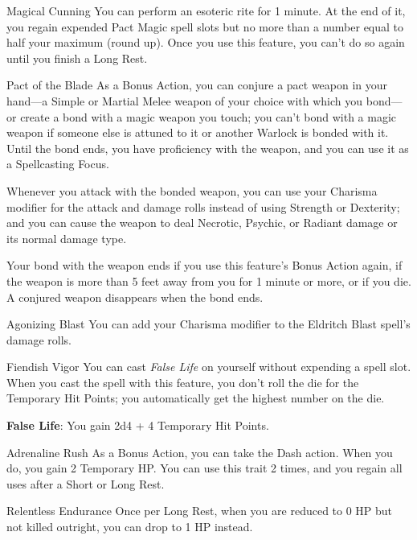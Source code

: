\begin{Card}{Magical Cunning}
You can perform an esoteric rite for 1 minute. At the end of it, you regain expended Pact Magic spell slots but no more than a number equal to half your maximum (round up). Once you use this feature, you can't do so again until you finish a Long Rest.
\end{Card}


\begin{Card}{Pact of the Blade}
As a Bonus Action, you can conjure a pact weapon in your hand—a Simple or Martial Melee weapon of your choice with which you bond—or create a bond with a magic weapon you touch; you can't bond with a magic weapon if someone else is attuned to it or another Warlock is bonded with it. Until the bond ends, you have proficiency with the weapon, and you can use it as a Spellcasting Focus.

Whenever you attack with the bonded weapon, you can use your Charisma modifier for the attack and damage rolls instead of using Strength or Dexterity; and you can cause the weapon to deal Necrotic, Psychic, or Radiant damage or its normal damage type.

Your bond with the weapon ends if you use this feature's Bonus Action again, if the weapon is more than 5 feet away from you for 1 minute or more, or if you die. A conjured weapon disappears when the bond ends.
\end{Card}


\begin{Card}{Agonizing Blast}
You can add your Charisma modifier to the Eldritch Blast spell's damage rolls.
\end{Card}


\begin{Card}{Fiendish Vigor}
You can cast \textit{False Life} on yourself without expending a spell slot. When you cast the spell with this feature, you don't roll the die for the Temporary Hit Points; you automatically get the highest number on the die.

\textbf{False Life}: You gain 2d4 + 4 Temporary Hit Points.
\end{Card}


\begin{Card}{Adrenaline Rush}
As a Bonus Action, you can take the Dash action. When you do, you gain 2 Temporary HP. You can use this trait 2 times, and you regain all uses after a Short or Long Rest.
\end{Card}


\begin{Card}{Relentless Endurance}
Once per Long Rest, when you are reduced to 0 HP but not killed outright, you can drop to 1 HP instead.
\end{Card}


